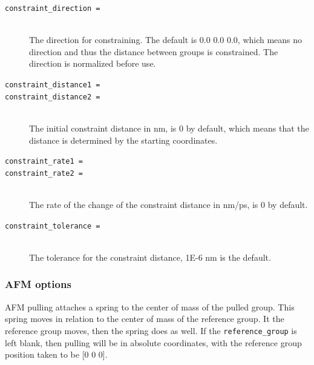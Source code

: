 \begin{description}
\item[\tt constraint\_direction     = ]\mbox{}\\
The direction for constraining.
The default is 0.0 0.0 0.0, which means no direction and
thus the distance between groups is constrained.
The direction is normalized before use.

\item[\tt constraint\_distance1     = ]
\item[\tt constraint\_distance2     = ]\mbox{}\\
The initial constraint distance in nm,
is 0 by default, which means that the distance is determined
by the starting coordinates.

\item[\tt constraint\_rate1         = ]
\item[\tt constraint\_rate2         = ]\mbox{}\\
The rate of the change of the constraint distance in nm/ps,
is 0 by default.

\item[\tt constraint\_tolerance     = ]\mbox{}\\
The tolerance for the constraint distance, 1E-6 nm is the default.

\end{description}


\subsubsection{AFM options}

AFM pulling attaches a spring to the center of mass of
the pulled group. This spring moves in relation to the
center of mass of the reference group. It the reference 
group moves, then the spring does as well. If the
{\tt reference\_group} is left blank, then pulling will be
in absolute coordinates, with the reference group position
taken to be [0 0 0].

